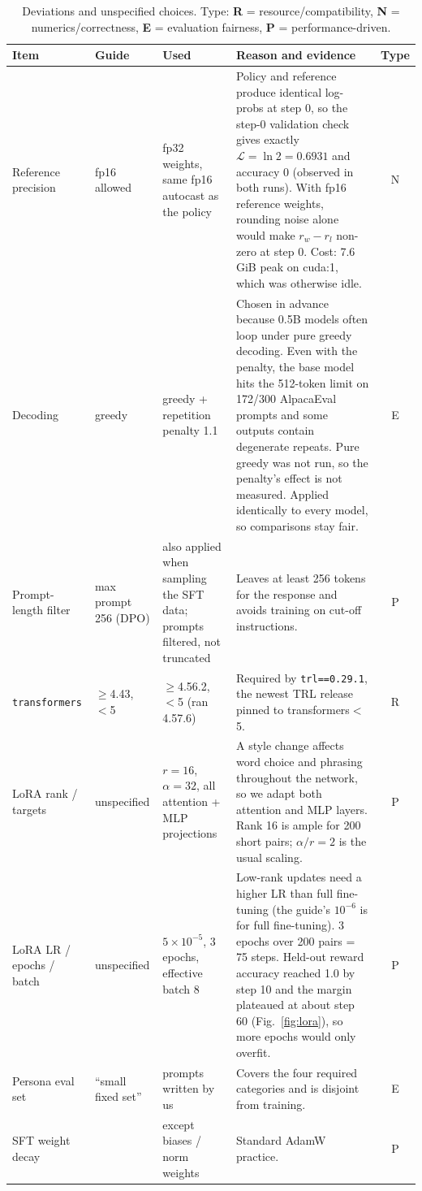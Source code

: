 \documentclass[10pt,a4paper]{article}
\newcommand{\code}[1]{\texttt{\small #1}}
\begin{document}
\begin{table}[h]
\centering\footnotesize
\caption{Deviations and unspecified choices. Type: \textbf{R} = resource/compatibility, \textbf{N} = numerics/correctness,
\textbf{E} = evaluation fairness, \textbf{P} = performance-driven.}
\label{tab:dev}
\setlength{\tabcolsep}{4pt}
\begin{tabularx}{\linewidth}{@{}>{\raggedright\arraybackslash}p{2.5cm} >{\raggedright\arraybackslash}p{2.2cm} >{\raggedright\arraybackslash}p{2.6cm} X c@{}}
\toprule
Item & Guide & Used & Reason and evidence & Type \\
\midrule
Reference precision & fp16 allowed & fp32 weights, same fp16 autocast as the policy & Policy and reference produce identical log-probs at step 0, so the step-0 validation check gives exactly $\mathcal{L}{=}\ln 2{=}0.6931$ and accuracy $0$ (observed in both runs). With fp16 reference weights, rounding noise alone would make $r_w-r_l$ non-zero at step 0. Cost: 7.6\,GiB peak on cuda:1, which was otherwise idle. & N \\
Decoding & greedy & greedy + repetition penalty 1.1 & Chosen in advance because 0.5B models often loop under pure greedy decoding. Even with the penalty, the base model hits the 512-token limit on 172/300 AlpacaEval prompts and some outputs contain degenerate repeats. Pure greedy was not run, so the penalty's effect is not measured. Applied identically to every model, so comparisons stay fair. & E \\
Prompt-length filter & max prompt 256 (DPO) & also applied when sampling the SFT data; prompts filtered, not truncated & Leaves at least 256 tokens for the response and avoids training on cut-off instructions. & P \\
\code{transformers} & $\ge$4.43, $<$5 & $\ge$4.56.2, $<$5 (ran 4.57.6) & Required by \code{trl==0.29.1}, the newest TRL release pinned to transformers$<$5. & R \\
LoRA rank / targets & unspecified & $r{=}16$, $\alpha{=}32$, all attention + MLP projections & A style change affects word choice and phrasing throughout the network, so we adapt both attention and MLP layers. Rank 16 is ample for 200 short pairs; $\alpha/r=2$ is the usual scaling. & P \\
LoRA LR / epochs / batch & unspecified & $5{\times}10^{-5}$, 3 epochs, effective batch 8 & Low-rank updates need a higher LR than full fine-tuning (the guide's $10^{-6}$ is for full fine-tuning). 3 epochs over 200 pairs = 75 steps. Held-out reward accuracy reached 1.0 by step 10 and the margin plateaued at about step 60 (Fig.~\ref{fig:lora}), so more epochs would only overfit. & P \\
Persona eval set & ``small fixed set'' & 40 prompts written by us & Covers the four required categories and is disjoint from training. & E \\
SFT weight decay & 0.1 & 0.1 except biases / norm weights & Standard AdamW practice. & P \\
\bottomrule
\end{tabularx}
\end{table}
\end{document}
